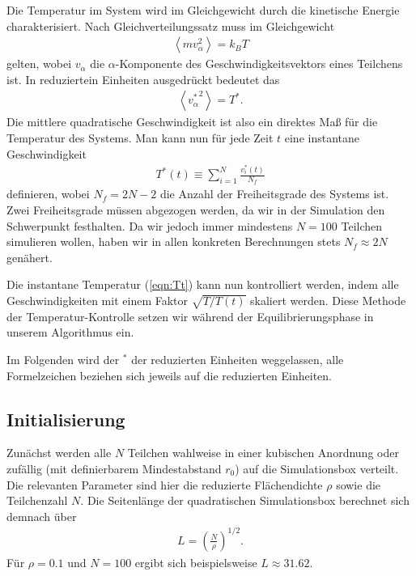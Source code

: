 \documentclass[11pt,a4paper]{article}
\begin{document}
Die Temperatur im System wird im Gleichgewicht durch die kinetische Energie charakterisiert. Nach Gleichverteilungssatz muss im Gleichgewicht 
\begin{align}
	\left\langle m v_{\alpha}^2 \right\rangle = k_B T
\end{align}
gelten, wobei $v_{\alpha}$ die $\alpha$-Komponente des Geschwindigkeitsvektors eines Teilchens ist. In reduziertein Einheiten ausgedrückt bedeutet das
\begin{align}
	\left\langle {v^*_{\alpha}}^2 \right\rangle = T^*.
\end{align}
Die mittlere quadratische Geschwindigkeit ist also ein direktes Maß für die Temperatur des Systems. Man kann nun für jede Zeit $t$ eine instantane Geschwindigkeit 
\begin{align}
	T^*(t) \equiv \sum_{i=1}^{N} \frac{v^*_i(t)}{N_f} \label{eqn:Tt}
\end{align}
definieren, wobei $N_f = 2N - 2$ die Anzahl der Freiheitsgrade des Systems ist. Zwei Freiheitsgrade müssen abgezogen werden, da wir in der Simulation den Schwerpunkt festhalten. Da wir jedoch immer mindestens $N=100$ Teilchen simulieren wollen, haben wir in allen konkreten Berechnungen stets $N_f \approx 2N$ genähert.

Die instantane Temperatur (\ref{eqn:Tt}) kann nun kontrolliert werden, indem alle Geschwindigkeiten mit einem Faktor $\sqrt{ T/T(t)}$ skaliert werden. Diese Methode der Temperatur-Kontrolle setzen wir während der Equilibrierungsphase in unserem Algorithmus ein.

Im Folgenden wird der $^*$ der reduzierten Einheiten weggelassen, alle Formelzeichen beziehen sich jeweils auf die reduzierten Einheiten.

\subsection{Initialisierung} %
\label{sub:initialisierung}
Zunächst werden alle $N$ Teilchen wahlweise in einer kubischen Anordnung oder zufällig (mit definierbarem Mindestabstand $r_0$) auf die Simulationsbox verteilt. Die relevanten Parameter sind hier die reduzierte Flächendichte $\rho$ sowie die Teilchenzahl $N$. Die Seitenlänge der quadratischen Simulationsbox berechnet sich demnach über
\begin{align*}
	L = \left( \frac{N}{\rho} \right)^{1/2}.
\end{align*}
Für $\rho = 0.1$ und $N = 100$ ergibt sich beispielsweise $L \approx 31.62$.
\end{document}
